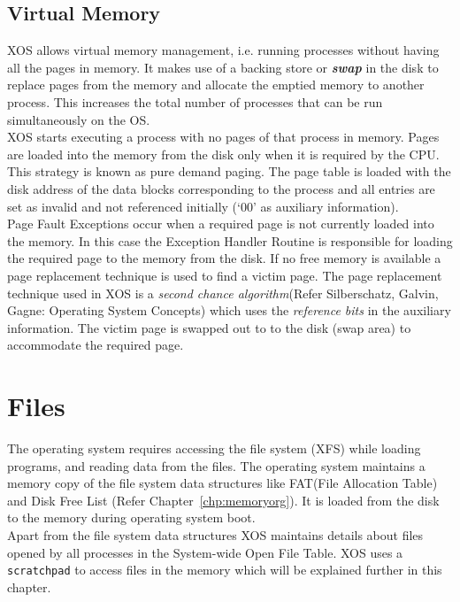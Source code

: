 \documentclass[10pt]{report}
\begin{document}
 
\section{Virtual Memory}
\label{sec:virtualmem}

XOS allows virtual memory management, i.e. running processes without having all the pages in memory. It makes use of a backing store or \textbf{\textit{swap}} in the disk to replace pages from the memory and allocate the emptied memory to another process. This increases the total number of processes that can be run simultaneously on the OS.\\

XOS starts executing a process with no pages of that process in memory. Pages are loaded into the memory from the disk only when it is required by the CPU. This strategy is known as pure demand paging. The page table is loaded with the disk address of the data blocks corresponding to the process and all entries are set as invalid and not referenced initially (`00' as auxiliary information).\\

Page Fault Exceptions occur when a required page is not currently loaded into the memory. In this case the Exception Handler Routine is responsible for loading the required page to the memory from the disk. If no free memory is available a page replacement technique is used to find a victim page. The page replacement technique used in XOS is a \textit{second chance algorithm}(Refer Silberschatz, Galvin, Gagne: Operating System Concepts) which uses the \textit{reference bits} in the auxiliary information. The victim page is swapped out to to the disk (swap area) to accommodate the required page.



 \chapter{Files}
\label{chp:files}

The operating system requires accessing the file system (XFS) while loading programs, and reading data from the files. The operating system maintains a memory copy of the file system data structures like FAT(File Allocation Table) and Disk Free List (Refer Chapter~\ref{chp:memoryorg}). It is loaded from the disk to the memory during operating system boot. \\
 Apart from the file system data structures XOS maintains details about files opened by all processes in the System-wide Open File Table. XOS uses a \texttt{scratchpad} to access files in the memory which will be explained further in this chapter.
 
\end{document}
